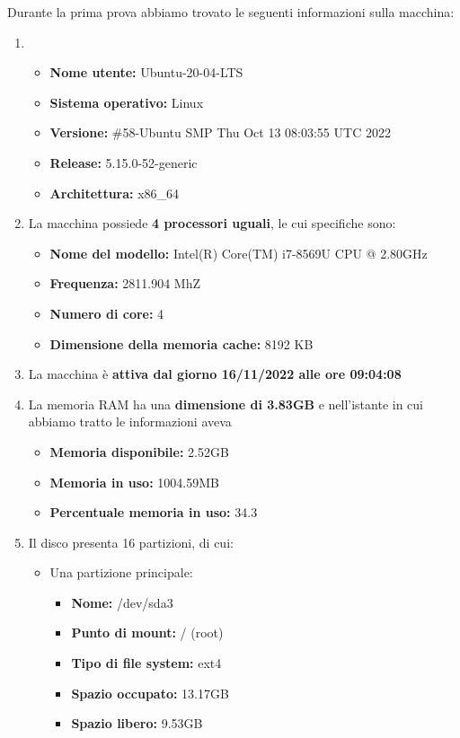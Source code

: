 \documentclass[a4paper]{report}
\begin{document}
Durante la prima prova abbiamo trovato le seguenti informazioni sulla macchina:
\begin{enumerate}
	\item
	\begin{itemize}
		\item \textbf{Nome utente:} Ubuntu-20-04-LTS
		\item \textbf{Sistema operativo:} Linux
		\item \textbf{Versione:} \#58-Ubuntu SMP Thu Oct 13 08:03:55 UTC 2022
		\item \textbf{Release:} 5.15.0-52-generic
		\item \textbf{Architettura:} x86\_64
	\end{itemize}
	\item La macchina possiede\textbf{ 4 processori uguali}, le cui specifiche sono:
	\begin{itemize}
		\item \textbf{Nome del modello:} Intel(R) Core(TM) i7-8569U CPU @ 2.80GHz
		\item \textbf{Frequenza:} 2811.904 MhZ
		\item \textbf{Numero di core:} 4
		\item \textbf{Dimensione della memoria cache:} 8192 KB
	\end{itemize}
	\item La macchina è \textbf{attiva dal giorno 16/11/2022 alle ore 09:04:08}
	\item La memoria RAM ha una \textbf{dimensione di 3.83GB} e nell'istante in cui abbiamo tratto le informazioni aveva
	\begin{itemize}
		\item \textbf{Memoria disponibile:} 2.52GB
		\item \textbf{Memoria in uso:} 1004.59MB
		\item \textbf{Percentuale memoria in uso:} 34.3%
	\end{itemize}
	\item Il disco presenta 16 partizioni, di cui:
	\begin{itemize}
		\item Una partizione principale:
		\begin{itemize}
			\item \textbf{Nome:} /dev/sda3
			\item \textbf{Punto di mount:} / (root)
			\item \textbf{Tipo di file system:} ext4
			\item \textbf{Spazio occupato:} 13.17GB
			\item \textbf{Spazio libero:} 9.53GB

\end{itemize}
\end{itemize}
\end{enumerate}
\end{document}
